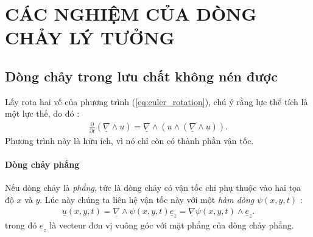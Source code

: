 \documentclass[CO_LUU_CHAT.tex]{subfiles}
\begin{document}
\chapter{CÁC NGHIỆM CỦA DÒNG CHẢY LÝ TƯỞNG}

\newpage

\section{Dòng chảy trong lưu chất không nén được}
Lấy rota hai vế của phương trình (\ref{eq:euler_rotation}), chú ý rằng lực thể tích là một lực thế, do đó :
\begin{equation}\label{eq:only_velocity}
	\begin{aligned}
		\boxed{
			\frac{\partial}{\partial t}\left(\underline{\nabla}\wedge\underline{u}\right)=\underline{\nabla}\wedge\left(\underline{u}\wedge\left(\underline{\nabla}\wedge\underline{u}\right)\right)
		}.
	\end{aligned}
\end{equation}
Phương trình này là hữu ích, vì nó chỉ còn có thành phần vận tốc.

\subsubsection{Dòng chảy phẳng}
Nếu dòng chảy là \emph{phẳng}, tức là dòng chảy có vận tốc chỉ phụ thuộc vào hai tọa độ $x$ và $y$. Lúc này chúng ta liên hệ vận tốc này với một \emph{hàm dòng} $\psi(x,y,t)$ :
\begin{equation}\label{eq:flux_func_def}
	\begin{aligned}
		\underline{u}\left(x,y,t\right)=\underline{\nabla}\wedge\psi(x,y,t)\underline{e}_z=\underline{\nabla}\psi(x,y,t)\wedge\underline{e}_z.
	\end{aligned}
\end{equation}
trong đó $\underline{e}_z$ là vecteur đơn vị vuông góc với mặt phẳng của dòng chảy phẳng.
\end{document}

